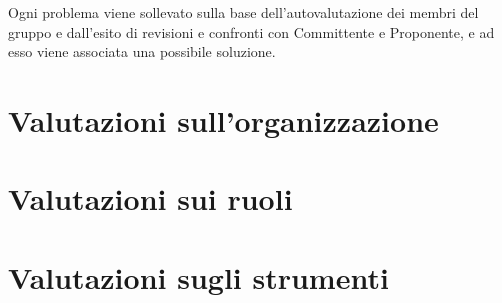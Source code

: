 \documentclass[openany,12pt,a4paper]{report}
\begin{document}
\noindent Ogni problema viene sollevato sulla base dell'autovalutazione dei membri del gruppo e dall'esito di revisioni e confronti con Committente e Proponente, e ad esso viene associata una possibile soluzione.

\section{Valutazioni sull'organizzazione}

\section{Valutazioni sui ruoli}

\section{Valutazioni sugli strumenti}
\end{document}
